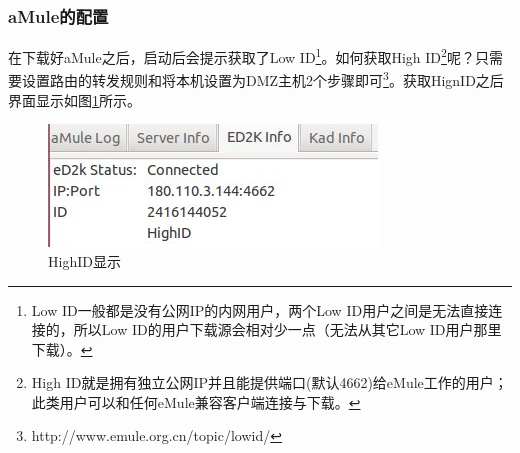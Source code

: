 \documentclass[paper=a4,fontsize=11pt]{article}
\begin{document}
	\subsubsection{aMule的配置}
	在下载好aMule之后，启动后会提示获取了Low ID\footnote{Low ID一般都是没有公网IP的内网用户，两个Low ID用户之间是无法直接连接的，所以Low ID的用户下载源会相对少一点（无法从其它Low ID用户那里下载）。}。如何获取High ID\footnote{High ID就是拥有独立公网IP并且能提供端口(默认4662)给eMule工作的用户；此类用户可以和任何eMule兼容客户端连接与下载。}呢？只需要设置路由的转发规则和将本机设置为DMZ主机2个步骤即可\footnote{http://www.emule.org.cn/topic/lowid/}。获取HignID之后界面显示如图\ref{GetHighID}所示。
	
	\begin{figure}[htbp]
		\centering
		\includegraphics[scale=0.8]{GetHighID.jpeg}
		\caption{HighID显示}
		\label{GetHighID}
	\end{figure}
	
\end{document}
